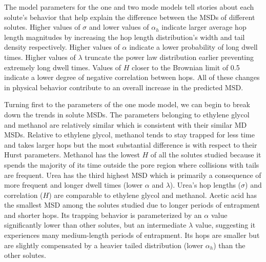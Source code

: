 \documentclass[aps,pre,preprint,groupedaddress]{revtex4-2}
\begin{document}
  The model parameters for the one and two mode models tell stories about each solute's
  behavior that help explain the difference between the MSDs of different solutes. 
  Higher values of $\sigma$ and lower values of $\alpha_h$ indicate larger average 
  hop length magnitudes by increasing the hop length distribution's width and tail 
  density respectively. Higher values of $\alpha$ indicate a lower probability of 
  long dwell times. Higher values of $\lambda$ truncate the power law distribution 
  earlier preventing extremely long dwell times. Values of $H$ closer to the Brownian
  limit of 0.5 indicate a lower degree of negative correlation between hops. All 
  of these changes in physical behavior contribute to 
  an overall increase in the predicted MSD.


  Turning first to the parameters of the one mode model, we can begin to break down the
  trends in solute MSDs. The parameters belonging to ethylene glycol and methanol are
  relatively similar which is consistent with their similar MD MSDs. Relative to 
  ethylene glycol, methanol tends to stay trapped for less time and takes larger hops
  but the most substantial difference is with respect to their Hurst parameters.  
  Methanol has the lowest $H$ of all the solutes studied because it spends the majority
  of its time outside the pore region where collisions with tails are frequent.
  Urea has the third highest MSD which is primarily a consequence of more frequent and
  longer dwell times (lower $\alpha$ and $\lambda$). Urea's hop lengths ($\sigma$) and
  correlation ($H$) are comparable to ethylene glycol and methanol. Acetic acid has the
  smallest MSD among the solutes studied due to longer periods of entrapment and shorter
  hops. Its trapping behavior is parameterized by an $\alpha$ value significantly lower
  than other solutes, but an intermediate $\lambda$ value, suggesting it experiences 
  many medium-length periods of entrapment. Its hops are smaller but are slightly 
  compensated by a heavier tailed distribution (lower $\alpha_h$) than the other solutes. 
  
\end{document}
